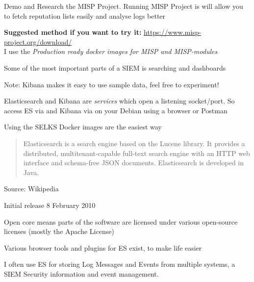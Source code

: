 \documentclass[Screen16to9,17pt]{foils}
\begin{document}
Demo and Research the MISP Project. Running MISP Project is  will allow you to fetch reputation lists easily and analyse logs better

{\bf Suggested method if you want to try it:} \url{https://www.misp-project.org/download/}\\
I use the \emph{Production ready docker images for MISP and MISP-modules }




\begin{list2}
\item Some of the most important parts of a SIEM is searching and dashboards
\end{list2}




Note: Kibana makes it easy to use sample data, feel free to experiment!

Elasticsearch and Kibana are \emph{services} which open a listening socket/port. So access ES via  and Kibana via  on your Debian using a browser or Postman

Using the SELKS Docker images are the easiest way



\begin{quote}
Elasticsearch is a search engine based on the Lucene library. It provides a distributed, multitenant-capable full-text search engine with an HTTP web interface and schema-free JSON documents. Elasticsearch is developed in Java.
\end{quote}

Source: Wikipedia 

\begin{list2}
\item Initial release	8 February 2010
\item Open core means parts of the software are licensed under various open-source licenses (mostly the Apache License)
\item Various browser tools and plugins for ES exist, to make life easier
\item I often use ES for storing Log Messages and Events from multiple systems, a SIEM Security information and event management.
\end{list2}
\end{document}
